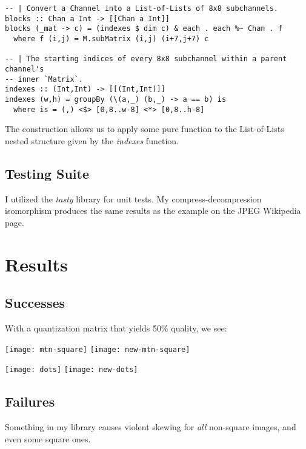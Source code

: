 \documentclass{article}
\begin{document}
\begin{lstlisting}
-- | Convert a Channel into a List-of-Lists of 8x8 subchannels.
blocks :: Chan a Int -> [[Chan a Int]]
blocks (_mat -> c) = (indexes $ dim c) & each . each %~ Chan . f
  where f (i,j) = M.subMatrix (i,j) (i+7,j+7) c

-- | The starting indices of every 8x8 subchannel within a parent channel's
-- inner `Matrix`.
indexes :: (Int,Int) -> [[(Int,Int)]]
indexes (w,h) = groupBy (\(a,_) (b,_) -> a == b) is
  where is = (,) <$> [0,8..w-8] <*> [0,8..h-8]  
\end{lstlisting}

The  construction allows us
to apply some pure function to the List-of-Lists nested structure
given by the \emph{indexes} function.

\subsection{Testing Suite}
I utilized the \emph{tasty} library for unit tests.
My compress-decompression isomorphism produces the same results
as the example on the JPEG Wikipedia page.

\section{Results}
\subsection{Successes}
With a quantization matrix that yields 50\% quality, we see:

\begin{center}
  \texttt{[image: mtn-square]}
  \texttt{[image: new-mtn-square]}
\end{center}

\begin{center}
  \texttt{[image: dots]}
  \texttt{[image: new-dots]}
\end{center}

\subsection{Failures}
Something in my library causes violent skewing for \emph{all} non-square
images, and even some square ones.
\end{document}

